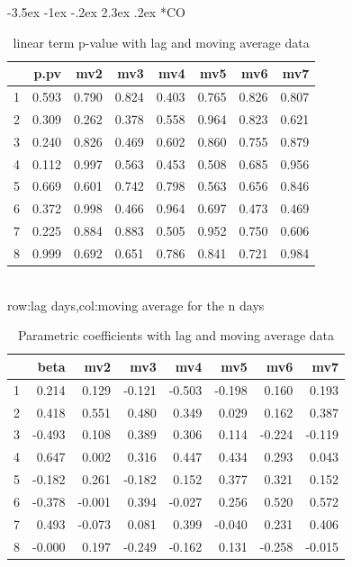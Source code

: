\documentclass[a4paper, 12pt]{article}
\makeatletter
\def\large{\fontsize{14}{20}\selectfont}
\renewcommand\subsection{\@startsection {subsection}{1}{\z@}%
                                   {-3.5ex \@plus -1ex \@minus -.2ex}%
                                   {2.3ex \@plus.2ex}%
                                   {\centering\normalfont\large\bfseries}}
\makeatother
\begin{document}
\subsection*{CO}
\begin{table}[h]
\centering
\caption{linear term p-value with lag and moving average data}
\begin{tabular}{rrrrrrrr}
  \hline
 & p.pv & mv2 & mv3 & mv4 & mv5 & mv6 & mv7 \\
  \hline
1 & 0.593 & 0.790 & 0.824 & 0.403 & 0.765 & 0.826 & 0.807 \\
  2 & 0.309 & 0.262 & 0.378 & 0.558 & 0.964 & 0.823 & 0.621 \\
  3 & 0.240 & 0.826 & 0.469 & 0.602 & 0.860 & 0.755 & 0.879 \\
  4 & 0.112 & 0.997 & 0.563 & 0.453 & 0.508 & 0.685 & 0.956 \\
  5 & 0.669 & 0.601 & 0.742 & 0.798 & 0.563 & 0.656 & 0.846 \\
  6 & 0.372 & 0.998 & 0.466 & 0.964 & 0.697 & 0.473 & 0.469 \\
  7 & 0.225 & 0.884 & 0.883 & 0.505 & 0.952 & 0.750 & 0.606 \\
  8 & 0.999 & 0.692 & 0.651 & 0.786 & 0.841 & 0.721 & 0.984 \\
   \hline
\end{tabular}
\\row:lag days,col:moving average for the n days
\end{table}
\begin{table}[h]
\centering
\caption{Parametric coefficients with lag and moving average data}
\begin{tabular}{rrrrrrrr}
  \hline
 & beta & mv2 & mv3 & mv4 & mv5 & mv6 & mv7 \\
  \hline
1 & 0.214 & 0.129 & -0.121 & -0.503 & -0.198 & 0.160 & 0.193 \\
  2 & 0.418 & 0.551 & 0.480 & 0.349 & 0.029 & 0.162 & 0.387 \\
  3 & -0.493 & 0.108 & 0.389 & 0.306 & 0.114 & -0.224 & -0.119 \\
  4 & 0.647 & 0.002 & 0.316 & 0.447 & 0.434 & 0.293 & 0.043 \\
  5 & -0.182 & 0.261 & -0.182 & 0.152 & 0.377 & 0.321 & 0.152 \\
  6 & -0.378 & -0.001 & 0.394 & -0.027 & 0.256 & 0.520 & 0.572 \\
  7 & 0.493 & -0.073 & 0.081 & 0.399 & -0.040 & 0.231 & 0.406 \\
  8 & -0.000 & 0.197 & -0.249 & -0.162 & 0.131 & -0.258 & -0.015 \\
   \hline
\end{tabular}
\end{table}
\end{document}
